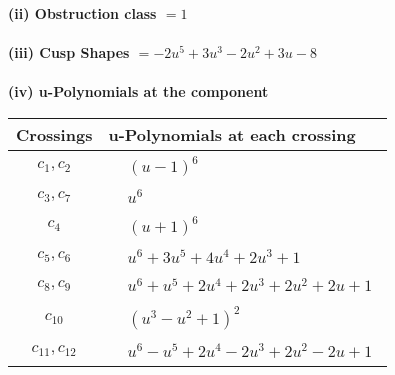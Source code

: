 \documentclass[1p]{elsarticle_modified}
\theoremstyle{definition}
\begin{document}
\flushleft \textbf{(ii) Obstruction class $= 1$}\\~\\
\flushleft \textbf{(iii) Cusp Shapes $= -2 u^5+3 u^3-2 u^2+3 u-8$}\\~\\
\newpage\renewcommand{\arraystretch}{1}
\flushleft \textbf{(iv) u-Polynomials at the component}\newline \\
\begin{tabular}{m{50pt}|m{274pt}}
Crossings & \hspace{64pt}u-Polynomials at each crossing \\
\hline $$\begin{aligned}c_{1},c_{2}\end{aligned}$$&$\begin{aligned}
&(u-1)^6
\end{aligned}$\\
\hline $$\begin{aligned}c_{3},c_{7}\end{aligned}$$&$\begin{aligned}
&u^6
\end{aligned}$\\
\hline $$\begin{aligned}c_{4}\end{aligned}$$&$\begin{aligned}
&(u+1)^6
\end{aligned}$\\
\hline $$\begin{aligned}c_{5},c_{6}\end{aligned}$$&$\begin{aligned}
&u^6+3 u^5+4 u^4+2 u^3+1
\end{aligned}$\\
\hline $$\begin{aligned}c_{8},c_{9}\end{aligned}$$&$\begin{aligned}
&u^6+u^5+2 u^4+2 u^3+2 u^2+2 u+1
\end{aligned}$\\
\hline $$\begin{aligned}c_{10}\end{aligned}$$&$\begin{aligned}
&(u^3- u^2+1)^2
\end{aligned}$\\
\hline $$\begin{aligned}c_{11},c_{12}\end{aligned}$$&$\begin{aligned}
&u^6- u^5+2 u^4-2 u^3+2 u^2-2 u+1
\end{aligned}$\\
\hline
\end{tabular}\\~\\
\end{document}
